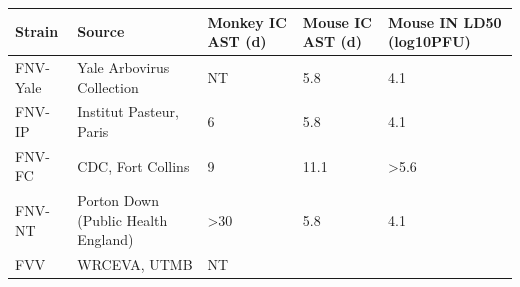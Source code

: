\footnotesize
	\tabulinesep=1.2mm
\begin{tabu} to \columnwidth {X[.9,l]X[2,l]X[l]X[l]X[l]}

	\rowfont[1]{\bfseries}
	\toprule
Strain   & Source  & Monkey IC AST \newline (d) & Mouse IC AST \newline (d) & Mouse IN LD50 \newline (log10PFU) \\ \midrule
FNV-Yale & Yale Arbovirus Collection           & NT                & 5.8              & 4.1                      \\
FNV-IP   & Institut Pasteur, Paris             & 6                 & 5.8              & 4.1                      \\
FNV-FC   & CDC, Fort Collins                   & 9                 & 11.1             & \textgreater5.6                     \\
FNV-NT   & Porton Down (Public Health England) & \textgreater30               & 5.8              & 4.1                      \\
FVV      & WRCEVA, UTMB                        & NT                &                  &                         \\ \bottomrule

	\end{tabu}
